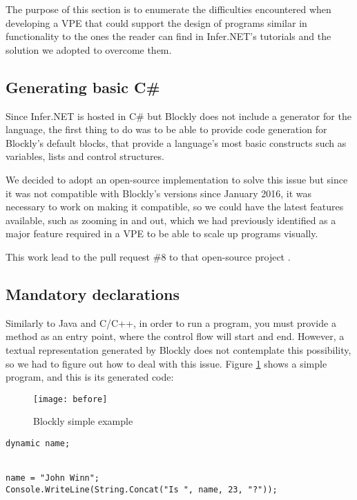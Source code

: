 The purpose of this section is to enumerate the difficulties encountered when
developing a VPE that could support the design of programs similar in functionality
to the ones the reader can find in Infer.NET's tutorials \cite{InferNET14t} and
the solution we adopted to overcome them.

\subsection{Generating basic C#}

Since Infer.NET is hosted in C# but Blockly does not include a generator for
the language, the first thing to do was to be able to provide code generation for
Blockly's default blocks, that provide a language's most basic constructs such
as variables, lists and control structures.

We decided to adopt an open-source implementation to solve this issue \cite{csgen}
but since it was not compatible with Blockly's versions since January 2016, it
was necessary to work on making it compatible, so we could have the latest features
available, such as zooming in and out, which we had previously identified as a
major feature required in a VPE to be able to scale up programs visually.

This work lead to the pull request \#8 to that open-source project \cite{csgenpr}.

\subsection{Mandatory declarations}

Similarly to Java and C/C++, in order to run a program, you must provide a method
as an entry point, where the control flow will start and end. However, a textual
representation generated by Blockly does not contemplate this possibility, so
we had to figure out how to deal with this issue. Figure \ref{fig:before} shows a simple program,
and this is its generated code:

\begin{figure}[!htpb]
  \begin{center}
    \leavevmode
    \texttt{[image: before]}
    \caption{Blockly simple example}
    \label{fig:before}
  \end{center}
\end{figure}

\begin{lstlisting}
dynamic name;


name = "John Winn";
Console.WriteLine(String.Concat("Is ", name, 23, "?"));
\end{lstlisting}

